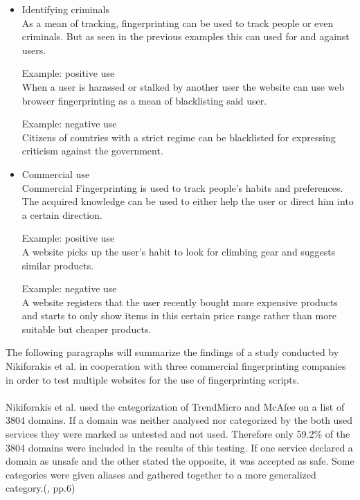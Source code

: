 \begin{itemize}
	\item Identifying criminals\\
	As a mean of tracking, fingerprinting can be used to track people or even criminals. But as seen in the previous examples this can used for and against users. 
	\begin{tcolorbox}
	Example: positive use\\
	When a user is harassed or stalked by another user the website can use web browser fingerprinting as a mean of blacklisting said user. 
	\end{tcolorbox}
	\begin{tcolorbox}
	Example: negative use\\
	Citizens of countries with a strict regime can be blacklisted for expressing criticism against the government.
	\end{tcolorbox}
	\item Commercial use\\
	Commercial Fingerprinting is used to track people’s habits and preferences. The acquired knowledge can be used to either help the user or direct him into a certain direction. 
	\begin{tcolorbox}
	Example: positive use\\
	A website picks up the user’s habit to look for climbing gear and suggests similar products.
	\end{tcolorbox}
	\begin{tcolorbox}
	Example: negative use\\
	A website registers that the user recently bought more expensive products and starts to only show items in this certain price range rather than more suitable but cheaper products.
	\end{tcolorbox}
\end{itemize}
The following paragraphs will summarize the findings of a study conducted by Nikiforakis et al. in cooperation with three commercial fingerprinting companies in order to test multiple websites for the use of fingerprinting scripts.\\\\
Nikiforakis et al. used the categorization of TrendMicro and McAfee on a list of 3804 domains. If a domain was neither analysed nor categorized by the both used services they were marked as untested and not used. Therefore only 59.2\% of the 3804 domains were included in the results of this testing. If one service declared a domain as unsafe and the other stated the opposite, it was accepted as safe. Some categories were given aliases and gathered together to a more generalized category.(\textcite{nikiforakis13}, pp.6)\\
